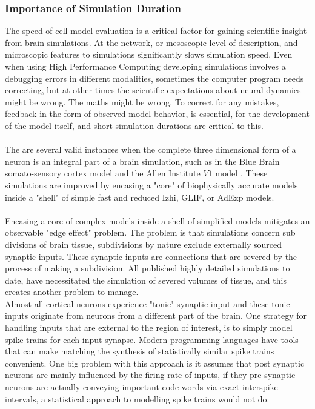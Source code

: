 \subsubsection{Importance of Simulation Duration}
The speed of cell-model evaluation is a critical factor for gaining scientific insight from brain simulations. At the network, or mesoscopic level of description, and  microscopic features to simulations significantly slows simulation speed. Even when using High Performance Computing developing simulations involves a debugging errors in different modalities, sometimes the computer program needs correcting, but at other times the scientific expectations about neural dynamics might be wrong. The maths might be wrong. To correct for any mistakes, feedback in the form of observed model behavior, is essential, for the development of the model itself, and short simulation durations are critical to this.\\
\\
The are several valid instances when the complete three dimensional form of a neuron is an integral part of a brain simulation, such as in the Blue Brain somato-sensory cortex model \cite{markram2006blue} and the Allen Institute $V1$ model \cite{billeh2020systematic}, These simulations are improved by encasing a "core" of biophysically accurate models inside a "shell" of simple fast and reduced Izhi, GLIF, or AdExp models.\\ 
\\
Encasing a core of complex models inside a shell of simplified models mitigates an observable "edge effect" problem. The problem is that simulations concern sub divisions of brain tissue, subdivisions by nature exclude externally sourced synaptic inputs. These synaptic inputs are connections that are severed by the process of making a subdivision. All published highly detailed simulations to date, have necessitated the simulation of severed volumes of tissue, and this creates another problem to manage.\\
Almost all cortical neurons experience "tonic" synaptic input and these tonic inputs originate from neurons from a different part of the brain. One strategy for handling inputs that are external to the region of interest, is to simply model spike trains for each input synapse. Modern programming languages have tools that can make matching the synthesis of statistically similar spike trains convenient. One big problem with this approach is it assumes that post synaptic neurons are mainly influenced by the firing rate of inputs, if they pre-synaptic neurons are actually conveying important code words via exact interspike intervals, a statistical approach to modelling spike trains would not do.\\

